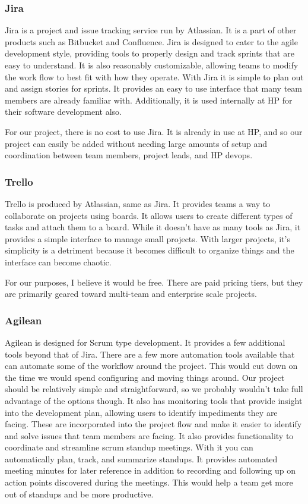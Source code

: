 \documentclass[onecolumn, draftclsnofoot,10pt, compsoc]{IEEEtran}
\begin{document}
\subsubsection{Jira}
Jira is a project and issue tracking service run by Atlassian.
It is a part of other products such as Bitbucket and Confluence.
Jira is designed to cater to the agile development style, providing tools to properly design and track sprints that are easy to understand.
It is also reasonably customizable, allowing teams to modify the work flow to best fit with how they operate.
With Jira it is simple to plan out and assign stories for sprints.
It provides an easy to use interface that many team members are already familiar with.
Additionally, it is used internally at HP for their software development also.

For our project, there is no cost to use Jira.
It is already in use at HP, and so our project can easily be added without needing large amounts of setup and coordination between team members, project leads, and HP devops.

\subsubsection{Trello}
Trello is produced by Atlassian, same as Jira.
It provides teams a way to collaborate on projects using boards.
It allows users to create different types of tasks and attach them to a board.
While it doesn’t have as many tools as Jira, it provides a simple interface to manage small projects.
With larger projects, it’s simplicity is a detriment because it becomes difficult to organize things and the interface can become chaotic.

For our purposes, I believe it would be free.
There are paid pricing tiers, but they are primarily geared toward multi-team and enterprise scale projects.

\subsubsection{Agilean}
Agilean is designed for Scrum type development.
It provides a few additional tools beyond that of Jira.
There are a few more automation tools available that can automate some of the workflow around the project.
This would cut down on the time we would spend configuring and moving things around.
Our project should be relatively simple and straightforward, so we probably wouldn’t take full advantage of the options though.
It also has monitoring tools that provide insight into the development plan, allowing users to identify impediments they are facing.
These are incorporated into the project flow and make it easier to identify and solve issues that team members are facing.
It also provides functionality to coordinate and streamline scrum standup meetings.
With it you can automatically plan, track, and summarize standups.
It provides automated meeting minutes for later reference in addition to recording and following up on action points discovered during the meetings.  This would help a team get more out of standups and be more productive.
\end{document}
